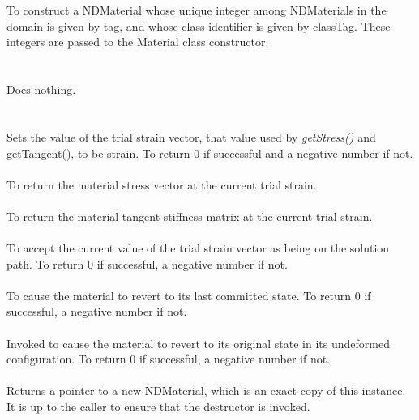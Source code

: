   \\
  \\
To construct a NDMaterial whose unique integer among
NDMaterials in the domain is given by \p tag, and whose class
identifier is given by \p classTag. These integers are passed to
the Material class constructor. \\

 \\
 \\
Does nothing. \\ 

 \\
  \\
Sets the value of the trial strain vector, that value used by {\em
getStress()} and getTangent(), to be \p strain. To return $0$
if successful and a negative number if not. \\

 \\
To return the material stress vector at the current trial strain. \\

 \\
To return the material tangent stiffness matrix at the current trial
strain. \\

 \\
To accept the current value of the trial strain vector as being on the
solution path. To return $0$ if successful, a negative number if not. \\

 \\
To cause the material to revert to its last committed state. To
return $0$ if successful, a negative number if not. \\

 \\
Invoked to cause the material to revert to its original state in its
undeformed configuration. To return $0$ if successful, a negative
number if not. \\

 \\
Returns a pointer to a new NDMaterial,
which is an exact copy of this instance. It is up to the caller to
ensure that the destructor is invoked. \\
